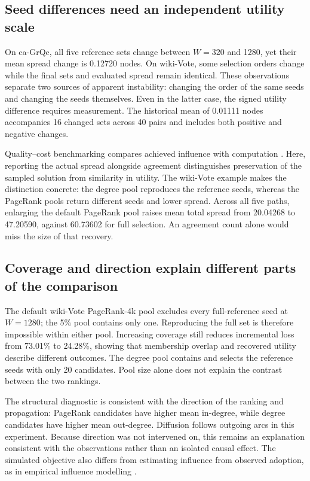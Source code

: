 \documentclass[smallextended]{svjour3}
\begin{document}
\subsection{Seed differences need an independent utility scale}
On ca-GrQc, all five reference sets change between $W=320$ and 1280, yet their mean spread change is 0.12720 nodes. On wiki-Vote, some selection orders change while the final sets and evaluated spread remain identical. These observations separate two sources of apparent instability: changing the order of the same seeds and changing the seeds themselves. Even in the latter case, the signed utility difference requires measurement. The historical mean of 0.01111 nodes accompanies 16 changed sets across 40 pairs and includes both positive and negative changes.

Quality--cost benchmarking compares achieved influence with computation \cite{ref16}. Here, reporting the actual spread alongside agreement distinguishes preservation of the sampled solution from similarity in utility. The wiki-Vote example makes the distinction concrete: the degree pool reproduces the reference seeds, whereas the PageRank pools return different seeds and lower spread. Across all five paths, enlarging the default PageRank pool raises mean total spread from 20.04268 to 47.20590, against 60.73602 for full selection. An agreement count alone would miss the size of that recovery.

\subsection{Coverage and direction explain different parts of the comparison}
The default wiki-Vote PageRank-4k pool excludes every full-reference seed at $W=1280$; the 5\% pool contains only one. Reproducing the full set is therefore impossible within either pool. Increasing coverage still reduces incremental loss from 73.01\% to 24.28\%, showing that membership overlap and recovered utility describe different outcomes. The degree pool contains and selects the reference seeds with only 20 candidates. Pool size alone does not explain the contrast between the two rankings.

The structural diagnostic is consistent with the direction of the ranking and propagation: PageRank candidates have higher mean in-degree, while degree candidates have higher mean out-degree. Diffusion follows outgoing arcs in this experiment. Because direction was not intervened on, this remains an explanation consistent with the observations rather than an isolated causal effect. The simulated objective also differs from estimating influence from observed adoption, as in empirical influence modelling \cite{ref15}.
\end{document}
